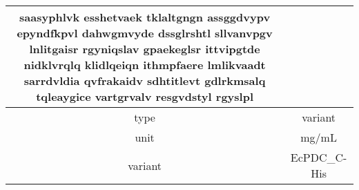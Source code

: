 \documentclass{article}%
\begin{document}
\begin{tabular}{|c|c|}
saasyphlvk esshetvaek \newline%
tklaltgngn assggdvypv \newline%
epyndfkpvl dahwgmvyde\newline%
dssglrshtl sllvanvpgv \newline%
lnlitgaisr rgyniqslav \newline%
gpaekeglsr ittvipgtde\newline%
nidklvrqlq klidlqeiqn \newline%
ithmpfaere lmlikvaadt \newline%
sarrdvldia qvfrakaidv\newline%
sdhtitlevt gdlrkmsalq \newline%
tqleaygice vartgrvalv \newline%
resgvdstyl rgyslpl\newline%
\\%
\hline%
type&variant\\%
\hline%
unit&mg/mL\\%
\hline%
variant&EcPDC\_C{-}His\\%
\hline%
\end{tabular}

%
\end{document}
